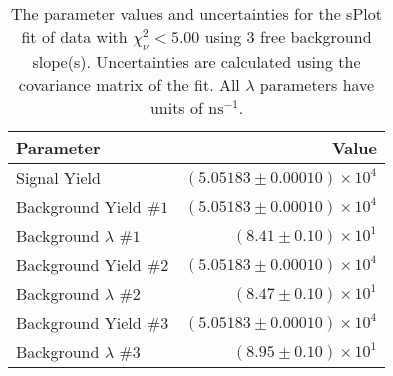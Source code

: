 
\begin{table}
    \begin{center}
        \begin{tabular}{lr}\toprule
            Parameter & Value \\\midrule
            Signal Yield & $(5.05183 \pm 0.00010) \times 10^{4}$ \\
            Background Yield $\#1$ & $(5.05183 \pm 0.00010) \times 10^{4}$ \\
            Background $\lambda$ $\#1$ & $(8.41 \pm 0.10) \times 10^{1}$ \\
            Background Yield $\#2$ & $(5.05183 \pm 0.00010) \times 10^{4}$ \\
            Background $\lambda$ $\#2$ & $(8.47 \pm 0.10) \times 10^{1}$ \\
            Background Yield $\#3$ & $(5.05183 \pm 0.00010) \times 10^{4}$ \\
            Background $\lambda$ $\#3$ & $(8.95 \pm 0.10) \times 10^{1}$ \\\bottomrule
        \end{tabular}
        \caption{The parameter values and uncertainties for the sPlot fit of data with $\chi^2_\nu < 5.00$ using 3 free background slope(s). Uncertainties are calculated using the covariance matrix of the fit. All $\lambda$ parameters have units of $\si{\nano\second}^{-1}$.}
    \end{center}
\end{table}
